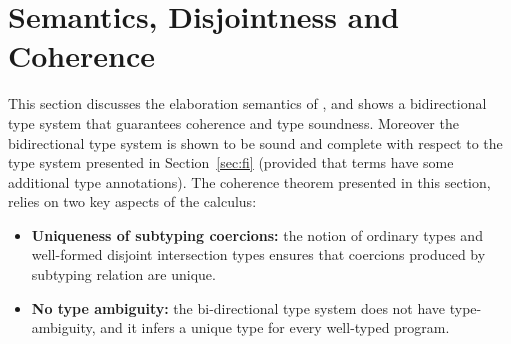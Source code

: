 \section{Semantics, Disjointness and Coherence}
\label{sec:disjoint}
This section discusses the elaboration semantics of \name, and shows a
bidirectional type system that guarantees coherence and type
soundness. Moreover the bidirectional type system is shown to be sound
and complete with respect to the type system presented in
Section~\ref{sec:fi} (provided that terms have some additional type
annotations). 
The coherence theorem presented in this section, relies on two key
aspects of the calculus:

\begin{itemize}

\item {\bf Uniqueness of subtyping coercions:} the notion of ordinary
  types and well-formed disjoint intersection types ensures that
  coercions produced by subtyping relation are unique.

\item {\bf No type ambiguity:} the bi-directional type system does not
  have type-ambiguity, and it infers a
  unique type for every well-typed program. 


\end{itemize}

%
%
%


